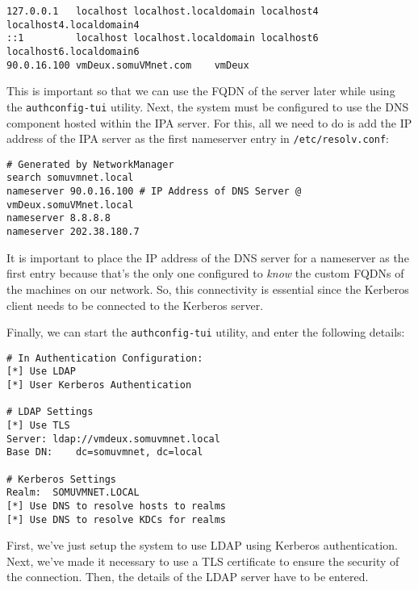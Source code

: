 \vspace{-15pt}
\begin{verbatim}
127.0.0.1   localhost localhost.localdomain localhost4 localhost4.localdomain4
::1         localhost localhost.localdomain localhost6 localhost6.localdomain6
90.0.16.100	vmDeux.somuVMnet.com	vmDeux
\end{verbatim}
\vspace{-10pt}

\noindent
This is important so that we can use the FQDN of the server later while using the \verb|authconfig-tui| utility. Next, the system must be configured to use the DNS component hosted within the IPA server. For this, all we need to do is add the IP address of the IPA server as the first nameserver entry in \verb|/etc/resolv.conf|:

\vspace{-15pt}
\begin{verbatim}
# Generated by NetworkManager
search somuvmnet.local
nameserver 90.0.16.100 # IP Address of DNS Server @ vmDeux.somuVMnet.local
nameserver 8.8.8.8
nameserver 202.38.180.7
\end{verbatim}
\vspace{-10pt}

\noindent
It is important to place the IP address of the DNS server for a nameserver as the first entry because that's the only one configured to \textit{know} the custom FQDNs of the machines on our network. So, this connectivity is essential since the Kerberos client needs to be connected to the Kerberos server. 

Finally, we can start the \verb|authconfig-tui| utility, and enter the following details:

\vspace{-15pt}
\begin{verbatim}
# In Authentication Configuration:
[*] Use LDAP
[*] User Kerberos Authentication

# LDAP Settings
[*] Use TLS
Server:	ldap://vmdeux.somuvmnet.local
Base DN:	dc=somuvmnet, dc=local

# Kerberos Settings
Realm:	SOMUVMNET.LOCAL	
[*] Use DNS to resolve hosts to realms
[*] Use DNS to resolve KDCs for realms
\end{verbatim}
\vspace{-10pt}

\noindent
First, we've just setup the system to use LDAP using Kerberos authentication. Next, we've made it necessary to use a TLS certificate to ensure the security of the connection. Then, the details of the LDAP server have to be entered.


